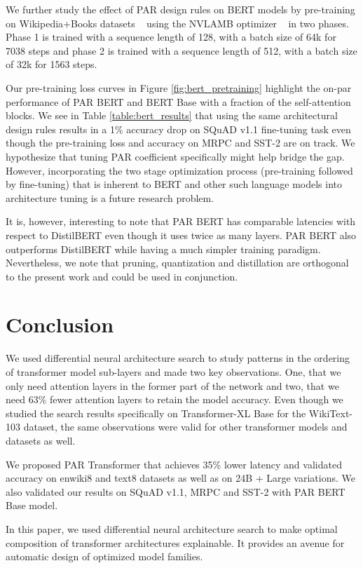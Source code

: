 \documentclass[11pt]{article}
\begin{document}
We further study the effect of PAR design rules on BERT models by pre-training on Wikipedia+Books datasets ~\citep{bookscorpus} using the NVLAMB optimizer ~\citep{nvlamb} in two phases. Phase 1 is trained with a sequence length of 128, with a batch size of 64k for 7038 steps and phase 2 is trained with a sequence length of 512, with a batch size of 32k for 1563 steps. 

Our pre-training loss curves in Figure \ref{fig:bert_pretraining} highlight the on-par performance of PAR BERT and BERT Base with a fraction of the self-attention blocks. We see in Table \ref{table:bert_results} that using the same architectural design rules results in a 1\% accuracy drop on SQuAD v1.1 fine-tuning task even though the pre-training loss and accuracy on MRPC and SST-2 are on track. We hypothesize that tuning PAR coefficient specifically might help bridge the gap. However, incorporating the two stage optimization process (pre-training followed by fine-tuning) that is inherent to BERT and other such language models into architecture tuning is a future research problem.

It is, however, interesting to note that PAR BERT has comparable latencies with respect to DistilBERT even though it uses twice as many layers. PAR BERT also outperforms DistilBERT while having a much simpler training paradigm. Nevertheless, we note that pruning, quantization and distillation are orthogonal to the present work and could be used in conjunction.

\section{Conclusion}

We used differential neural architecture search to study patterns in the ordering of transformer model sub-layers and made two key observations. One, that we only need attention layers in the former part of the network and two, that we need 63\% fewer attention layers to retain the model accuracy. Even though we studied the search results specifically on Transformer-XL Base for the WikiText-103 dataset, the same observations were valid for other transformer models and datasets as well. 

We proposed PAR Transformer that achieves 35\% lower latency and validated accuracy on enwiki8 and text8 datasets as well as on 24B + Large variations. We also validated our results on SQuAD v1.1, MRPC and SST-2 with PAR BERT Base model. 

In this paper, we used differential neural architecture search to make optimal composition of transformer architectures explainable. It provides an avenue for automatic design of optimized model families.
\end{document}
